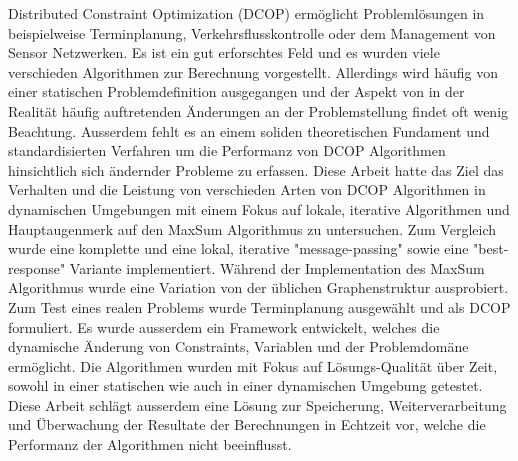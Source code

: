 \begin{zusammenfassung}
Distributed Constraint Optimization (DCOP) erm{\"o}glicht Probleml{\"o}sungen in beispielweise Terminplanung, Verkehrsflusskontrolle oder dem Management von Sensor Netzwerken. Es ist ein gut erforschtes Feld und es wurden viele verschieden Algorithmen zur Berechnung vorgestellt. Allerdings wird h{\"a}ufig von einer statischen Problemdefinition ausgegangen und der Aspekt von in der Realit{\"a}t h{\"a}ufig auftretenden {\"A}nderungen an der Problemstellung findet oft wenig Beachtung. Ausserdem fehlt es an einem soliden theoretischen Fundament und standardisierten Verfahren um die Performanz von DCOP Algorithmen hinsichtlich sich {\"a}ndernder Probleme zu erfassen. Diese Arbeit hatte das Ziel das Verhalten und die Leistung von verschieden Arten von DCOP Algorithmen in dynamischen Umgebungen mit einem Fokus auf lokale, iterative Algorithmen und Hauptaugenmerk auf den MaxSum Algorithmus zu untersuchen. Zum Vergleich wurde eine komplette und eine lokal, iterative "message-passing" sowie eine "best-response" Variante implementiert. W{\"a}hrend der Implementation des MaxSum Algorithmus wurde eine Variation von der {\"u}blichen Graphenstruktur ausprobiert. Zum Test eines realen Problems wurde Terminplanung ausgew{\"a}hlt und als DCOP formuliert. Es wurde ausserdem ein Framework entwickelt, welches die dynamische {\"A}nderung von Constraints, Variablen und der Problemdom{\"a}ne erm{\"o}glicht. Die Algorithmen wurden mit Fokus auf L{\"o}sungs-Qualit{\"a}t {\"u}ber Zeit, sowohl in einer statischen wie auch in einer dynamischen Umgebung getestet. Diese Arbeit schl{\"a}gt ausserdem eine L{\"o}sung zur Speicherung, Weiterverarbeitung und {\"U}berwachung der Resultate der Berechnungen in Echtzeit vor, welche die Performanz der Algorithmen nicht beeinflusst.
\end{zusammenfassung}


